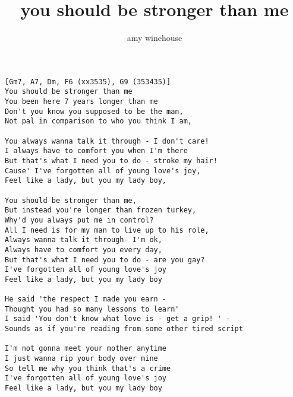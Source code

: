 \author{amy winehouse}
\title{you should be stronger than me}
\maketitle
\begin{verbatim}
[Gm7, A7, Dm, F6 (xx3535), G9 (353435)]
You should be stronger than me
You been here 7 years longer than me
Don't you know you supposed to be the man,
Not pal in comparison to who you think I am,

You always wanna talk it through - I don't care!
I always have to comfort you when I'm there
But that's what I need you to do - stroke my hair!
Cause' I've forgotten all of young love's joy,
Feel like a lady, but you my lady boy,

You should be stronger than me,
But instead you're longer than frozen turkey,
Why'd you always put me in control?
All I need is for my man to live up to his role,
Always wanna talk it through- I'm ok,
Always have to comfort you every day,
But that's what I need you to do - are you gay?
I've forgotten all of young love's joy
Feel like a lady, but you my lady boy

He said 'the respect I made you earn -
Thought you had so many lessons to learn'
I said 'You don't know what love is - get a grip! ' -
Sounds as if you're reading from some other tired script

I'm not gonna meet your mother anytime
I just wanna rip your body over mine
So tell me why you think that's a crime
I've forgotten all of young love's joy
Feel like a lady, but you my lady boy
\end{verbatim}